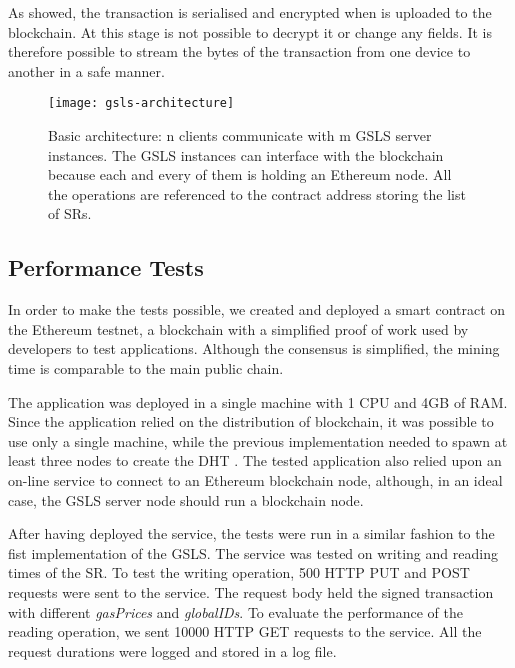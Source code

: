 As showed, the transaction is serialised and encrypted when is uploaded to the blockchain.
At this stage is not possible to decrypt it or change any fields. It is therefore possible to stream the bytes of the transaction from one device to another in a safe manner.
\\

\begin{figure}[h]
	\centering
  \texttt{[image: gsls-architecture]}
	\caption{Basic architecture: n clients communicate with m GSLS server instances. The GSLS instances can interface with the blockchain because each and every of them is holding an Ethereum node. All the operations are referenced to the contract address storing the list of SRs.}
	\label{fig4}
\end{figure}

\subsection{Performance Tests}

In order to make the tests possible, we created and deployed a smart contract on the Ethereum testnet, a blockchain with a simplified proof of work used by developers to test applications. Although the consensus is simplified, the mining time is comparable to the main public chain. 

The application was deployed in a single machine with 1 CPU and 4GB of RAM. Since the application relied on the distribution of blockchain, it was possible to use only a single machine, while the previous implementation needed to spawn at least three nodes to create the DHT \cite{gondor_distributed_2016}. The tested application also relied upon an on-line service to connect to an Ethereum blockchain node, although, in an ideal case, the GSLS server node should run a blockchain node. 

After having deployed the service, the tests were run in a similar fashion to the fist implementation of the GSLS. The service was tested on writing and reading times of the SR. To test the writing operation, 500 HTTP PUT and POST requests were sent to the service. The request body held the signed transaction with different \textit{gasPrices} and \textit{globalIDs}. To evaluate the performance of the reading operation, we sent 10000 HTTP GET requests to the service. All the request durations were logged and stored in a log file.


